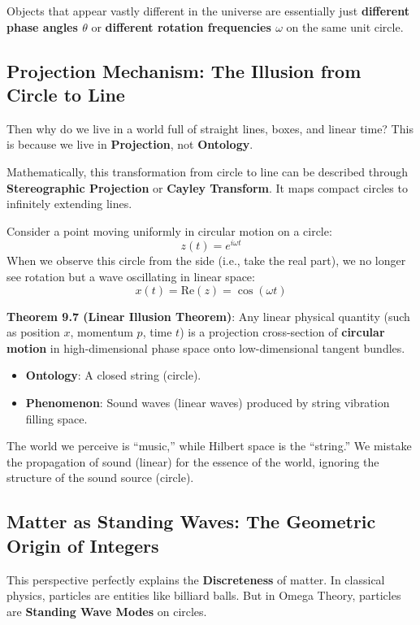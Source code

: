 Objects that appear vastly different in the universe are essentially just \textbf{different phase angles $\theta$} or \textbf{different rotation frequencies $\omega$} on the same unit circle.

\subsection{Projection Mechanism: The Illusion from Circle to Line}

Then why do we live in a world full of straight lines, boxes, and linear time?
This is because we live in \textbf{Projection}, not \textbf{Ontology}.

Mathematically, this transformation from circle to line can be described through \textbf{Stereographic Projection} or \textbf{Cayley Transform}. It maps compact circles to infinitely extending lines.

Consider a point moving uniformly in circular motion on a circle:
\[z(t) = e^{i\omega t}\]
When we observe this circle from the side (i.e., take the real part), we no longer see rotation but a wave oscillating in linear space:
\[x(t) = \text{Re}(z) = \cos(\omega t)\]

\textbf{Theorem 9.7 (Linear Illusion Theorem)}:
Any linear physical quantity (such as position $x$, momentum $p$, time $t$) is a projection cross-section of \textbf{circular motion} in high-dimensional phase space onto low-dimensional tangent bundles.
\begin{itemize}
\item \textbf{Ontology}: A closed string (circle).
\item \textbf{Phenomenon}: Sound waves (linear waves) produced by string vibration filling space.
\end{itemize}
The world we perceive is ``music,'' while Hilbert space is the ``string.'' We mistake the propagation of sound (linear) for the essence of the world, ignoring the structure of the sound source (circle).

\subsection{Matter as Standing Waves: The Geometric Origin of Integers}

This perspective perfectly explains the \textbf{Discreteness} of matter.
In classical physics, particles are entities like billiard balls. But in Omega Theory, particles are \textbf{Standing Wave Modes} on circles.

